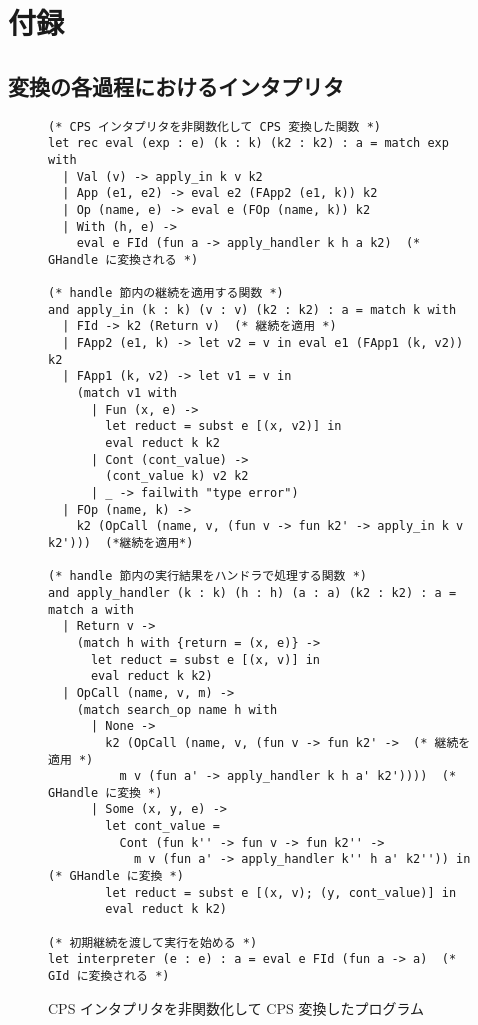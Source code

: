 \newpage
\appendix
\section{付録}

\subsection{変換の各過程におけるインタプリタ}
\begin{figure}[!b]
\begin{spacing}{0.9}
\begin{verbatim}
(* CPS インタプリタを非関数化して CPS 変換した関数 *)
let rec eval (exp : e) (k : k) (k2 : k2) : a = match exp with
  | Val (v) -> apply_in k v k2
  | App (e1, e2) -> eval e2 (FApp2 (e1, k)) k2
  | Op (name, e) -> eval e (FOp (name, k)) k2
  | With (h, e) ->
    eval e FId (fun a -> apply_handler k h a k2)  (* GHandle に変換される *)

(* handle 節内の継続を適用する関数 *)
and apply_in (k : k) (v : v) (k2 : k2) : a = match k with
  | FId -> k2 (Return v)  (* 継続を適用 *)
  | FApp2 (e1, k) -> let v2 = v in eval e1 (FApp1 (k, v2)) k2
  | FApp1 (k, v2) -> let v1 = v in
    (match v1 with
      | Fun (x, e) ->
        let reduct = subst e [(x, v2)] in
        eval reduct k k2
      | Cont (cont_value) ->
        (cont_value k) v2 k2
      | _ -> failwith "type error")
  | FOp (name, k) ->
    k2 (OpCall (name, v, (fun v -> fun k2' -> apply_in k v k2')))  (*継続を適用*)

(* handle 節内の実行結果をハンドラで処理する関数 *)
and apply_handler (k : k) (h : h) (a : a) (k2 : k2) : a = match a with
  | Return v ->
    (match h with {return = (x, e)} ->
      let reduct = subst e [(x, v)] in
      eval reduct k k2)
  | OpCall (name, v, m) ->
    (match search_op name h with
      | None ->
        k2 (OpCall (name, v, (fun v -> fun k2' ->  (* 継続を適用 *)
          m v (fun a' -> apply_handler k h a' k2'))))  (* GHandle に変換 *)
      | Some (x, y, e) ->
        let cont_value =
          Cont (fun k'' -> fun v -> fun k2'' ->
            m v (fun a' -> apply_handler k'' h a' k2'')) in  (* GHandle に変換 *)
        let reduct = subst e [(x, v); (y, cont_value)] in
        eval reduct k k2)

(* 初期継続を渡して実行を始める *)
let interpreter (e : e) : a = eval e FId (fun a -> a)  (* GId に変換される *)
\end{verbatim}
\caption{CPS インタプリタを非関数化して CPS 変換したプログラム}
\label{figure:3cps}
\end{spacing}
\end{figure}


